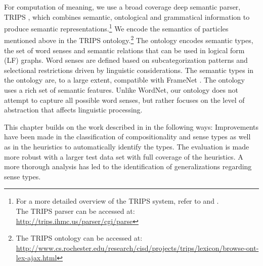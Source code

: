 \documentclass[output=paper
,modfonts
,nonflat]{langsci/langscibook}
\begin{document}
For computation of meaning, we use a broad coverage deep semantic parser, TRIPS \citep{All07}, which combines semantic, ontological and grammatical information to produce semantic representations.\footnote{For a more detailed overview of the TRIPS system, refer to \citet{All17} and \citet{All08}.\\The TRIPS parser can be accessed at: \url{http://trips.ihmc.us/parser/cgi/parse}} We encode the semantics of particles mentioned above in the TRIPS ontology.\footnote{The TRIPS ontology can be accessed at: \url{http://www.cs.rochester.edu/research/cisd/projects/trips/lexicon/browse-ont-lex-ajax.html}} The ontology encodes semantic types, the set of word senses and semantic relations that can be used in logical form (LF) graphs. Word senses are defined based on subcategorization patterns and selectional restrictions driven by linguistic considerations. The semantic types in the ontology are, to a large extent, compatible with FrameNet \citep{Joh00}. The ontology uses a rich set of semantic features. Unlike WordNet, our ontology does not attempt to capture all possible word senses, but rather focuses on the level of abstraction that affects linguistic processing.

This chapter builds on the work described in \citet{Bha17} in the following ways: Improvements have been made in the classification of compositionality and sense types as well as in the heuristics to automatically identify the types. The evaluation is made more robust with a larger test data set with full coverage of the heuristics. A more thorough analysis has led to the identification of generalizations regarding sense types. 

\end{document}
